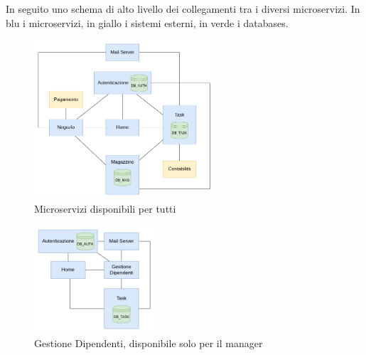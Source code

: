 \documentclass{report}
\begin{document}
In seguito uno schema di alto livello dei collegamenti tra i diversi microservizi. In blu i microservizi, in giallo i sistemi esterni, in verde i databases.

\begin{figure}[h]
	\centering
	\includegraphics[width=0.6\textwidth]{back_end_short}
	\caption{Microservizi disponibili per tutti}
\end{figure}	

\begin{figure}[h]
	\centering
	\includegraphics[width=0.4\textwidth]{admin_back_end}
	\caption{Gestione Dipendenti, disponibile solo per il manager}
\end{figure}
\end{document}
